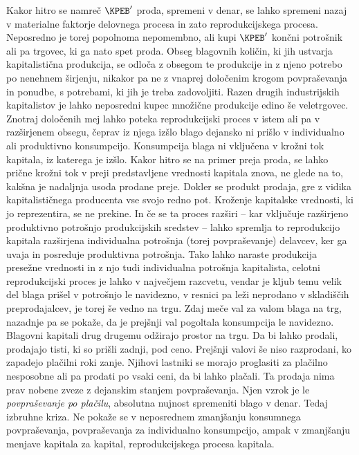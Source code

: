 \documentclass[kapital_02.tex]{subfiles}
\begin{document}
Kakor hitro se namreč \( \KPEB' \) proda, spremeni v denar, se lahko spremeni nazaj v materialne faktorje delovnega procesa in zato reprodukcijskega procesa. Neposredno je torej popolnoma nepomembno, ali kupi \( \KPEB' \) končni potrošnik ali pa trgovec, ki ga nato spet proda. Obseg blagovnih količin, ki jih ustvarja kapitalistična produkcija, se odloča z obsegom te produkcije in z njeno potrebo po nenehnem širjenju, nikakor pa ne z vnaprej določenim krogom povpraševanja in ponudbe, s potrebami, ki jih je treba zadovoljiti. Razen drugih industrijskih kapitalistov je lahko neposredni kupec množične produkcije edino še veletrgovec. Znotraj določenih mej lahko poteka reprodukcijski proces v istem ali pa v razširjenem obsegu, čeprav iz njega izšlo blago dejansko ni prišlo v individualno ali produktivno konsumpcijo. Konsumpcija blaga ni vključena v krožni tok kapitala, iz katerega je izšlo. Kakor hitro se na primer preja proda, se lahko prične krožni tok v preji predstavljene vrednosti kapitala znova, ne glede na to, kakšna je nadaljnja usoda prodane preje. Dokler se produkt prodaja, gre z vidika kapitalističnega producenta vse svojo redno pot. Kroženje kapitalske vrednosti, ki jo reprezentira, se ne prekine. In če se ta proces razširi -- kar vključuje razširjeno produktivno potrošnjo produkcijskih sredstev -- lahko spremlja to reprodukcijo kapitala razširjena individualna potrošnja (torej povpraševanje) delavcev, ker ga uvaja in posreduje produktivna potrošnja. Tako lahko naraste produkcija presežne vrednosti in z njo tudi individualna potrošnja kapitalista, celotni reprodukcijski proces je lahko v \KPEstran največjem razcvetu, vendar je kljub temu velik del blaga prišel v potrošnjo le navidezno, v resnici pa leži neprodano v skladiščih preprodajalcev, je torej še vedno na trgu. Zdaj meče val za valom blaga na trg, nazadnje pa se pokaže, da je prejšnji val pogoltala konsumpcija le navidezno. Blagovni kapitali drug drugemu odžirajo prostor na trgu. Da bi lahko prodali, prodajajo tisti, ki so prišli zadnji, pod ceno. Prejšnji valovi še niso razprodani, ko zapadejo plačilni roki zanje. Njihovi lastniki se morajo proglasiti za plačilno nesposobne ali pa prodati po vsaki ceni, da bi lahko plačali. Ta prodaja nima prav nobene zveze z dejanskim stanjem povpraševanja. Njen vzrok je le \emph{povpraševanje po plačilu}, absolutna nujnost spremeniti blago v denar. Tedaj izbruhne kriza. Ne pokaže se v neposrednem zmanjšanju konsumnega povpraševanja, povpraševanja za individualno konsumpcijo, ampak v zmanjšanju menjave kapitala za kapital, reprodukcijskega procesa kapitala.
\end{document}
